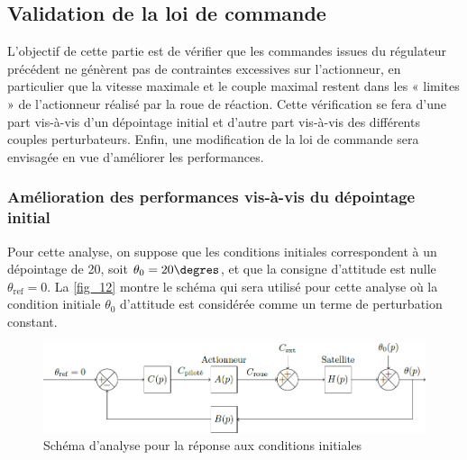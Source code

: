 \subsection{\label{sec:3:D} Validation de la loi de commande}
\begin{obj}
L’objectif de cette partie est de vérifier que les commandes issues du régulateur précédent ne
génèrent pas de contraintes excessives sur l’actionneur, en particulier que la vitesse maximale
et le couple maximal restent dans les « limites » de l’actionneur réalisé par la roue de réaction.
Cette vérification se fera d’une part vis-à-vis d’un dépointage initial et d’autre part vis-à-vis des
différents couples perturbateurs. Enfin, une modification de la loi de commande sera envisagée en
vue d’améliorer les performances.
\end{obj}

\subsubsection{\label{sec:3:D:1} Amélioration des performances vis-à-vis du dépointage initial}

\ifprof
\else

Pour cette analyse, on suppose que les conditions initiales correspondent à un dépointage de 20\degres, soit $\theta_0 = 20\degres$,
et que la consigne d’attitude est nulle $\theta_{\text{ref}}=0$. La \autoref{fig_12} montre le schéma qui sera utilisé pour cette analyse
où la condition initiale $\theta_0$ d’attitude est considérée comme un terme de perturbation constant.

\begin{figure}[H]
\centering
\includegraphics[width=\linewidth]{images/fig_12}
\caption{Schéma d’analyse pour la réponse aux conditions initiales \label{fig_12}}
\end{figure}
\fi



